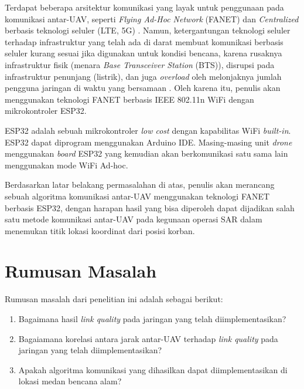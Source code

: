 \documentclass[main]{subfiles}
\begin{document}
Terdapat beberapa arsitektur komunikasi yang layak untuk penggunaan pada komunikasi antar-UAV, seperti \textit{Flying Ad-Hoc Network} (FANET) \cite{khanFlyingAdhocNetworks2017} dan \textit{Centralized} berbasis teknologi seluler (LTE, 5G) \cite{linSkyNotLimit2018}. Namun, ketergantungan teknologi seluler terhadap infrastruktur yang telah ada di darat membuat komunikasi berbasis seluler kurang sesuai jika digunakan untuk kondisi bencana, karena rusaknya infrastruktur fisik (menara \textit{Base Transceiver Station} (BTS)), disrupsi pada infrastruktur penunjang (listrik), dan juga \textit{overload} oleh melonjaknya jumlah pengguna jaringan di waktu yang bersamaan  \cite{townsendTelecommunicationsInfrastructureDisasters2005}. Oleh karena itu, penulis akan menggunakan teknologi FANET berbasis IEEE 802.11n WiFi dengan mikrokontroler ESP32.

ESP32 adalah sebuah mikrokontroler \textit{low cost} dengan kapabilitas WiFi \textit{built-in}. ESP32 dapat diprogram menggunakan Arduino IDE. Masing-masing unit \textit{drone} menggunakan \textit{board} ESP32 yang kemudian akan berkomunikasi satu sama lain menggunakan mode WiFi Ad-hoc.

Berdasarkan latar belakang permasalahan di atas, penulis akan merancang sebuah algoritma komunikasi antar-UAV menggunakan teknologi FANET berbasis ESP32, dengan harapan hasil yang bisa diperoleh dapat dijadikan salah satu metode komunikasi antar-UAV pada kegunaan operasi SAR dalam menemukan titik lokasi koordinat dari posisi korban.
\newline

\section{Rumusan Masalah}
Rumusan masalah dari penelitian ini adalah sebagai berikut:
\begin{enumerate}
	\item Bagaimana hasil \textit{link quality} pada jaringan yang telah diimplementasikan?
	\item Bagaiamana korelasi antara jarak antar-UAV terhadap \textit{link quality} pada jaringan yang telah diimplementasikan?
	\item Apakah algoritma komunikasi yang dihasilkan dapat diimplementasikan di lokasi medan bencana alam?
\end{enumerate}
\end{document}
